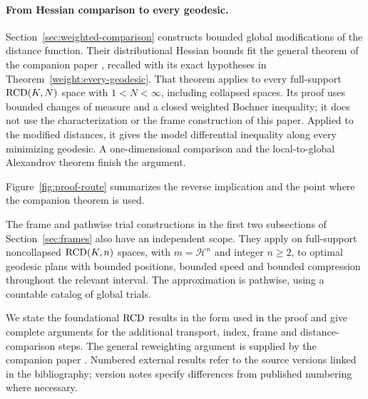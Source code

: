 \paragraph{From Hessian comparison to every geodesic.}
Section~\ref{sec:weighted-comparison} constructs bounded global
modifications of the distance function. Their distributional Hessian
bounds fit the general theorem of the companion paper
\cite[Theorem~1.1]{WeakHessianCompanion}, recalled with its exact
hypotheses in Theorem~\ref{weight:every-geodesic}. That theorem applies
to every full-support \(\mathrm{RCD}(K,N)\) space with \(1<N<\infty\),
including collapsed spaces. Its proof uses bounded changes of measure
and a closed weighted Bochner inequality; it does not use the
characterization or the frame construction of this paper. Applied to
the modified distances, it gives the model differential inequality
along every minimizing geodesic. A one-dimensional comparison and
the local-to-global Alexandrov theorem finish the argument.

Figure~\ref{fig:proof-route} summarizes the reverse implication and
the point where the companion theorem is used.


The frame and pathwise trial constructions in the first two
subsections of Section~\ref{sec:frames} also have an independent scope.
They apply on full-support noncollapsed \(\mathrm{RCD}(K,n)\) spaces,
with \(m=\mathcal H^n\) and integer \(n\ge2\), to optimal geodesic
plans with bounded positions, bounded speed and bounded compression
throughout the relevant interval. The approximation is pathwise,
using a countable catalog of global trials.

We state the foundational \(\mathrm{RCD}\) results in the form used in the
proof and give complete arguments for the additional transport,
index, frame and distance-comparison steps. The general reweighting
argument is supplied by the companion paper \cite{WeakHessianCompanion}.
Numbered external results refer to the source versions linked in
the bibliography; version notes specify differences from published
numbering where necessary.
